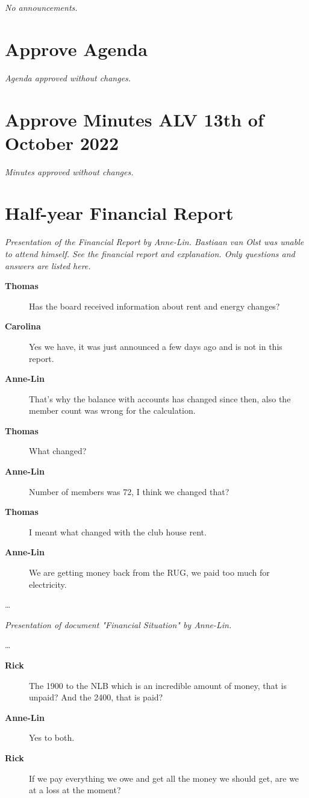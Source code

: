 \documentclass[12pt, a4paper]{article}
\newcommand{\speak}[2]{\begin{description}\item[\textbf{#1}]#2\end{description}}
\begin{document}
\textit{No announcements.}

\section{Approve Agenda}

\textit{Agenda approved without changes.}

\section{Approve Minutes ALV 13th of October 2022}

\textit{Minutes approved without changes.}

\section{Half-year Financial Report}

\textit{Presentation of the Financial Report by Anne-Lin. Bastiaan van Olst was unable to attend himself. See the financial report and explanation. Only questions and answers are listed here.}

\speak{Thomas}{Has the board received information about rent and energy changes?}

\speak{Carolina}{Yes we have, it was just announced a few days ago and is not in this report.}

\speak{Anne-Lin}{That's why the balance with accounts has changed since then, also the member count was wrong for the calculation.}

\speak{Thomas}{What changed?}

\speak{Anne-Lin}{Number of members was 72, I think we changed that?}

\speak{Thomas}{I meant what changed with the club house rent.}

\speak{Anne-Lin}{We are getting money back from the RUG, we paid too much for electricity.}

\dots

\textit{Presentation of document "Financial Situation" by Anne-Lin.}

\dots

\speak{Rick}{The 1900 to the NLB which is an incredible amount of money, that is unpaid? And the 2400, that is paid?}

\speak{Anne-Lin}{Yes to both.}

\speak{Rick}{If we pay everything we owe and get all the money we should get, are we at a loss at the moment?}
\end{document}

